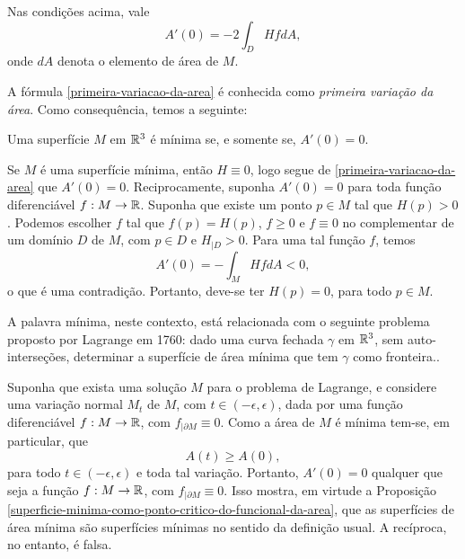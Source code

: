 \begin{teorema}
	Nas condições acima, vale
	\begin{equation}\label{primeira-variacao-da-area}
		A'(0) = -2 \int_D H f dA,
	\end{equation}
	onde $dA$ denota o elemento de área de $M$.
\end{teorema}

A fórmula \eqref{primeira-variacao-da-area} é conhecida como \emph{primeira variação da área}. Como consequência, temos a seguinte:

\begin{proposicao}\label{superficie-minima-como-ponto-critico-do-funcional-da-area}
	Uma superfície $M$ em $\mathbb{R}^3$ é mínima se, e somente se, $A'(0)=0$.
\end{proposicao}

\begin{demonstracao}
	Se $M$ é uma superfície mínima, então $H \equiv 0$, logo segue de \eqref{primeira-variacao-da-area} que $A'(0)=0$. Reciprocamente, suponha $A'(0)=0$ para toda função diferenciável $f: M \rightarrow \mathbb{R}$. Suponha que existe um ponto $p \in M$ tal que $H(p)>0$. Podemos escolher $f$ tal que $f(p) = H(p)$, $f \geq 0$ e $f \equiv 0$ no complementar de um domínio $D$ de $M$, com $p \in D$ e $H_{|D}>0$. Para uma tal função $f$, temos
	\begin{equation*}
		A'(0) = -\int_M H f dA <0,
	\end{equation*}
	o que é uma contradição. Portanto, deve-se ter $H(p)=0$, para todo $p \in M$.
\end{demonstracao}

A palavra mínima, neste contexto, está relacionada com o seguinte problema proposto por Lagrange em 1760: dado uma curva fechada $\gamma$ em $\mathbb{R}^3$, sem auto-interseções, determinar a superfície de área mínima que tem $\gamma$ como fronteira..

Suponha que exista uma solução $M$ para o problema de Lagrange, e considere uma variação normal $M_t$ de $M$, com $t \in (-\epsilon,\epsilon)$, dada por uma função diferenciável $f: M \rightarrow \mathbb{R}$, com $f_{| \partial M} \equiv 0$. Como a área de $M$ é mínima tem-se, em particular, que
\begin{equation*}
	A(t) \geq A(0),
\end{equation*}
para todo $t \in (-\epsilon,\epsilon)$ e toda tal variação. Portanto, $A'(0)=0$ qualquer que seja a função $f: M \rightarrow \mathbb{R}$, com $f_{| \partial M} \equiv 0$. Isso mostra, em virtude a Proposição \ref{superficie-minima-como-ponto-critico-do-funcional-da-area}, que as superfícies de área mínima são superfícies mínimas no sentido da definição usual. A recíproca, no entanto, é falsa.

